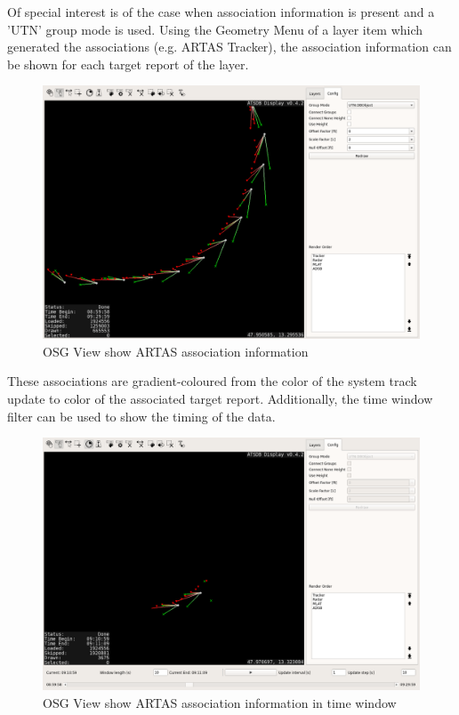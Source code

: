 Of special interest is of the case when association information is present and a 'UTN' group mode is used. Using the Geometry Menu of a layer item which generated the associations (e.g. ARTAS Tracker), the association information can be shown for each target report of the layer.

\begin{figure}[H]
    \hspace*{-2.5cm}
    \includegraphics[width=19cm]{../screenshots/osgview_assoc.png}
  \caption{OSG View show ARTAS association information}
\end{figure}

These associations are gradient-coloured from the color of the system track update to color of the associated target report. Additionally, the time window filter can be used to show the timing of the data.

\begin{figure}[H]
    \hspace*{-2.5cm}
    \includegraphics[width=19cm]{../screenshots/osgview_assoc_time_window.png}
  \caption{OSG View show ARTAS association information in time window}
\end{figure}


